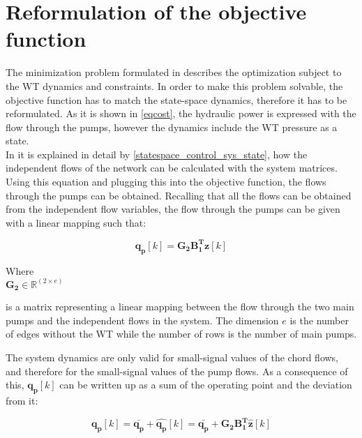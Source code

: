 \section{Reformulation of the objective function}
\label{ObjFunc_reform}

The minimization problem formulated in  describes the optimization subject to the WT dynamics and constraints. In order to make this problem solvable, the objective function has to match the state-space dynamics, therefore it has to be reformulated. As it is shown in \eqref{eqcost}, the hydraulic power is expressed with the flow through the pumps, however the dynamics include the WT pressure as a state. 
\\
In  it is explained in detail by \eqref{statespace_control_sys_state}, how the independent flows of the network can be  calculated with the system matrices. Using this equation and plugging this into the objective function, the flows through the pumps can be obtained. Recalling that all the flows can be obtained from the independent flow variables, the flow through the pumps can be given with a linear mapping such that: 

\begin{equation}
\bm{q_p}[k]  = \bm{G_{2}} \bm{B_{1}^T}  \bm{z}[k]
\label{mapping_mainP}
\end{equation}

\begin{minipage}[t]{0.20\textwidth}
Where\\
\hspace*{8mm} $\bm{G_{2}} \in \bm{\mathbb{R}}^{(2 \times e)} $ 
\end{minipage}
\begin{minipage}[t]{0.68\textwidth}
\vspace*{2mm}
is a matrix representing a linear mapping between the flow through the two main pumps and the independent flows in the system. The dimension $e$ is the number of edges without the WT while the number of rows is the number of main pumps. 
\end{minipage} 

The system dynamics are only valid for small-signal values of the chord flows, and therefore for the small-signal values of the pump flows. As a consequence of this, $\bm{q_p}[k]$ can be written up as a sum of the operating point and the deviation from it:  

\begin{equation}
\bm{q_p}[k]  = \bm{\bar{q_p}} + \bm{\hat{q_p}}[k] = \bm{\bar{q_p}} + \bm{G_{2}} \bm{B_{1}^T}  \bm{\hat{z}}[k]
\label{mapping_mainP_1}
\end{equation}

